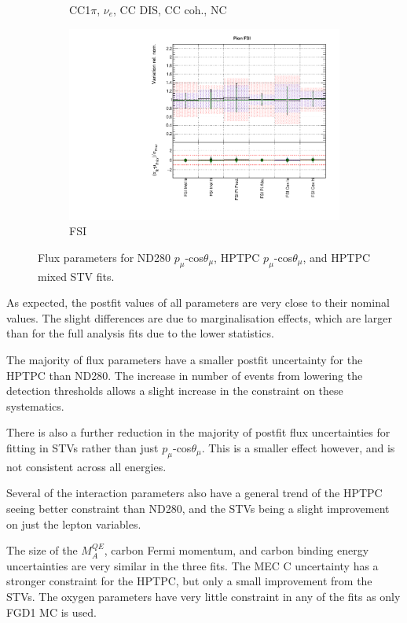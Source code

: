 \begin{figure}
\begin{subfigure}{0.49\textwidth}
  \caption{CC1$\pi$, $\nu_e$, CC DIS, CC coh., NC}
\end{subfigure}
\begin{subfigure}{0.49\textwidth}
  \centering
  \includegraphics[width=0.95\linewidth]{figs/hptpcfitsxsec_3}
  \caption{FSI}
\end{subfigure}
\caption{Flux parameters for ND280 $p_{\mu}$-cos$\theta_{\mu}$, HPTPC $p_{\mu}$-cos$\theta_{\mu}$, and HPTPC mixed STV fits.}
\label{fig:hptpcxsec}
\end{figure}

As expected, the postfit values of all parameters are very close to their nominal values. The slight differences are due to marginalisation effects, which are larger than for the full analysis fits due to the lower statistics.

The majority of flux parameters have a smaller postfit uncertainty for the HPTPC than ND280. The increase in number of events from lowering the detection thresholds allows a slight increase in the constraint on these systematics.

There is also a further reduction in the majority of postfit flux uncertainties for fitting in STVs rather than just $p_{\mu}$-cos$\theta_{\mu}$. This is a smaller effect however, and is not consistent across all energies.

Several of the interaction parameters also have a general trend of the HPTPC seeing better constraint than ND280, and the STVs being a slight improvement on just the lepton variables.

The size of the $M_{A}^{QE}$, carbon Fermi momentum, and carbon binding energy uncertainties are very similar in the three fits. The MEC C uncertainty has a stronger constraint for the HPTPC, but only a small improvement from the STVs. The oxygen parameters have very little constraint in any of the fits as only FGD1 MC is used. 

